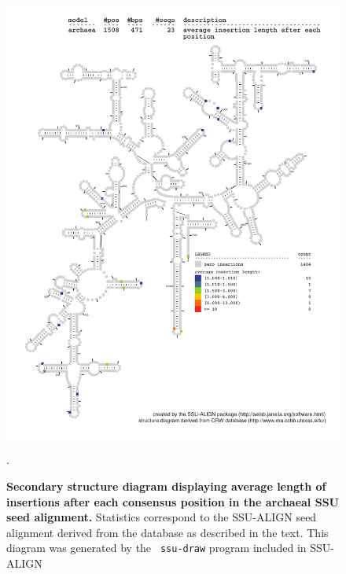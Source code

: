 \begin{figure}
\begin{center}
\includegraphics[width=5.7in]{Figures/archaea-0p1-iavglen}
\end{center}
\caption[Secondary structure diagram displaying average length of insertions
  after each consensus position in the archaeal SSU seed
  alignment]{\textbf{Secondary structure diagram displaying average
    length of insertions after each consensus position in the archaeal SSU seed
  alignment.} Statistics correspond to the SSU-ALIGN seed
  alignment derived from the  database \cite{CannoneGutell02}
  as described in the text. This diagram was generated by the {\tt
  ssu-draw} program included in SSU-ALIGN}.
\label{fig:arciavglen}
\end{figure}


\newpage 

